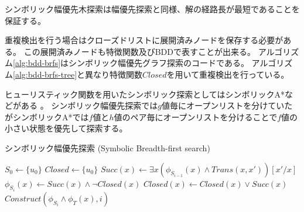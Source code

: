 シンボリック幅優先木探索は幅優先探索と同様、解の経路長が最短であることを保証する。



重複検出を行う場合はクローズドリストに展開済みノードを保存する必要がある。
この展開済みノードも特徴関数及びBDDで表すことが出来る。
アルゴリズム\ref{alg:bdd-brfs}はシンボリック幅優先グラフ探索のコードである。
アルゴリズム\ref{alg:bdd-brfs-tree}と異なり特徴関数$Closed$を用いて重複検出を行っている。

ヒューリスティック関数を用いたシンボリック探索としてはシンボリックA*などがある \cite{edelkamp1998obdds}。
シンボリック幅優先探索では$g$値毎にオープンリストを分けていたがシンボリックA*では$f$値と$h$値のペア毎にオープンリストを分けることで$f$値の小さい状態を優先して探索する。


\begin{algorithm}
\caption{シンボリック幅優先探索 (Symbolic Breadth-first search)}
\label{alg:bdd-brfs}
	$S_0 \leftarrow \{u_0\}$\;
	$Closed \leftarrow \{u_0\}$\;
	 {
		$Succ(x) \leftarrow \exists x (\phi_{S_{i-1}}(x) \land Trans(x,x'))[x'/x]$\;
		$\phi_{S_i}(x) \leftarrow Succ(x) \land \lnot Closed(x)$\;
		$Closed(x) \leftarrow Closed(x) \lor Succ(x)$\;
		 {
			\Return $Construct(\phi_{S_i} \land \phi_T(x), i)$\;
		}
	}
\end{algorithm}



